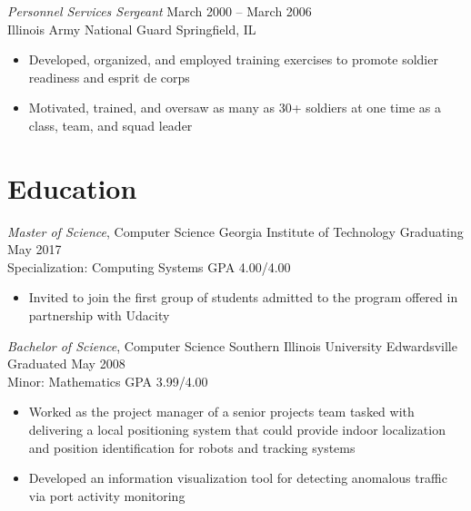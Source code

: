 \documentclass[margin,line]{resume}
\begin{document}
\begin{resume}

{\sl Personnel Services Sergeant}  \hfill   March 2000 -- March 2006\\
Illinois Army National Guard  \hfill   Springfield, IL
\begin{itemize} \itemsep -2pt %
\small\item Developed, organized, and employed training exercises to promote soldier readiness and esprit de corps
\small\item Motivated, trained, and oversaw as many as 30+ soldiers at one time as a class, team, and squad leader
\end{itemize}

\section{Education}
{\small
  {\sl Master of Science}, Computer Science \hfill
  Georgia Institute of Technology \hfill
  Graduating May 2017\\
  Specialization: Computing Systems \hfill
  GPA 4.00/4.00
}
\begin{itemize} \itemsep -2pt %
\small\item Invited to join the first group of students admitted to the program offered in partnership with Udacity
\end{itemize}

{\small
  {\sl Bachelor of Science}, Computer Science \hfill
  Southern Illinois University Edwardsville   \hfill
  Graduated May 2008\\
  Minor: Mathematics \hfill
  GPA 3.99/4.00
}
\begin{itemize} \itemsep -2pt %
\small\item Worked as the project manager of a senior projects team tasked with delivering a local positioning
            system that could provide indoor localization and position identification for robots and tracking systems
\small\item Developed an information visualization tool for detecting anomalous traffic via port activity monitoring
\end{itemize}


\end{resume}
\end{document}
